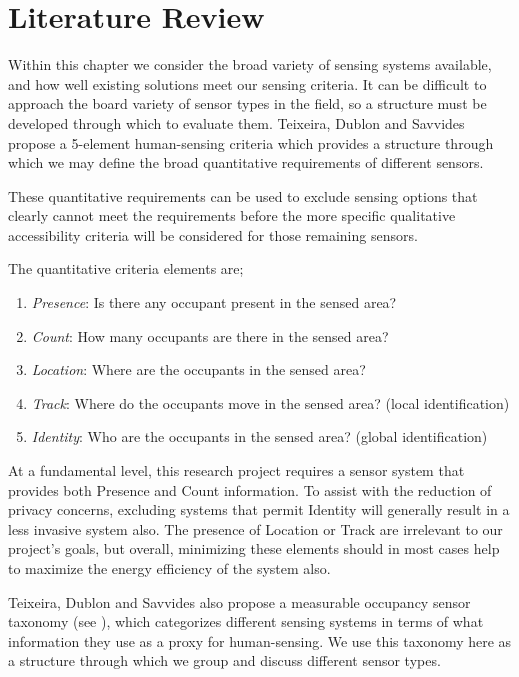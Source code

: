 \documentclass[../thesis/thesis.tex]{subfiles}
\begin{document}
\chapter{Literature Review}
\label{chap:litreview}
\label{sec:litreview:sensors}

Within this chapter we consider the broad variety of sensing systems available, and how well existing solutions meet our sensing criteria. It can be difficult to approach the board variety of sensor types in the field, so a structure must be developed through which to evaluate them. Teixeira, Dublon and Savvides \cite{teixeira2010survey} propose a 5-element human-sensing criteria which provides a structure through which we may define the broad quantitative requirements of different sensors.

These quantitative requirements can be used to exclude sensing options that clearly cannot meet the requirements before the more specific qualitative accessibility criteria will be considered for those remaining sensors. 

The quantitative criteria elements are;
\begin{enumerate}
 \item \emph{Presence}: Is there any occupant present in the sensed area?
 \item \emph{Count}: How many occupants are there in the sensed area?
 \item \emph{Location}: Where are the occupants in the sensed area?
 \item \emph{Track}: Where do the occupants move in the sensed area? (local identification)
 \item \emph{Identity}: Who are the occupants in the sensed area? (global identification)
\end{enumerate}

At a fundamental level, this research project requires a sensor system that provides both Presence and Count information. To assist with the reduction of privacy concerns, excluding systems that permit Identity will generally result in a less invasive system also. The presence of Location or Track are irrelevant to our project's goals, but overall, minimizing these elements should in most cases help to maximize the energy efficiency of the system also.

Teixeira, Dublon and Savvides \cite{teixeira2010survey} also propose a measurable occupancy sensor taxonomy (see ), which categorizes different sensing systems in terms of what information they use as a proxy for human-sensing. We use this taxonomy here as a structure through which we group and discuss different sensor types.
\end{document}

